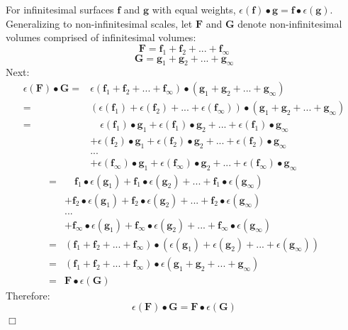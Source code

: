 For infinitesimal surfaces \(\mathbf{f}\) and \(\mathbf{g}\) with equal weights, \(\epsilon(\mathbf{f}) \bullet \mathbf{g} = \mathbf{f} \bullet \epsilon(\mathbf{g})\). Generalizing to non-infinitesimal scales, let \(\mathbf{F}\) and \(\mathbf{G}\) denote non-infinitesimal volumes comprised of infinitesimal volumes:
\[\mathbf{F} = \mathbf{f}_1 + \mathbf{f}_2 + ... + \mathbf{f}_{\infty}\] 
\[\mathbf{G} = \mathbf{g}_1 + \mathbf{g}_2 + ... + \mathbf{g}_{\infty}\]
Next:
\begin{align*}
\epsilon(\mathbf{F}) \bullet \mathbf{G} 
= & \epsilon(\mathbf{f}_1 + \mathbf{f}_2 + ... + \mathbf{f}_{\infty}) \bullet (\mathbf{g}_1 + \mathbf{g}_2 + ... + \mathbf{g}_{\infty}) \\
= & (\epsilon(\mathbf{f}_1) + \epsilon(\mathbf{f}_2) + ... + \epsilon(\mathbf{f}_{\infty})) \bullet (\mathbf{g}_1 + \mathbf{g}_2 + ... + \mathbf{g}_{\infty}) \\  
= & \quad \epsilon(\mathbf{f}_1) \bullet \mathbf{g}_1 + \epsilon(\mathbf{f}_1) \bullet \mathbf{g}_2 + ... + \epsilon(\mathbf{f}_1) \bullet \mathbf{g}_\infty \\  
& + \epsilon(\mathbf{f}_2) \bullet \mathbf{g}_1 + \epsilon(\mathbf{f}_2) \bullet \mathbf{g}_2 + ... + \epsilon(\mathbf{f}_2) \bullet \mathbf{g}_\infty \\  
& ... \\
& + \epsilon(\mathbf{f}_\infty) \bullet \mathbf{g}_1 + \epsilon(\mathbf{f}_\infty) \bullet \mathbf{g}_2 + ... + \epsilon(\mathbf{f}_\infty) \bullet \mathbf{g}_\infty   
\end{align*}
\begin{align*}
= & \quad \mathbf{f}_1 \bullet \epsilon(\mathbf{g}_1) + \mathbf{f}_1 \bullet \epsilon(\mathbf{g}_2) + ... + \mathbf{f}_1 \bullet \epsilon(\mathbf{g}_\infty) \\  
& + \mathbf{f}_2 \bullet \epsilon(\mathbf{g}_1) + \mathbf{f}_2 \bullet \epsilon(\mathbf{g}_2) + ... + \mathbf{f}_2 \bullet \epsilon(\mathbf{g}_\infty) \\  
& ... \\
& + \mathbf{f}_\infty \bullet \epsilon(\mathbf{g}_1) + \mathbf{f}_\infty \bullet \epsilon(\mathbf{g}_2) + ... + \mathbf{f}_\infty \bullet \epsilon(\mathbf{g}_\infty) \\  
= & (\mathbf{f}_1 + \mathbf{f}_2 + ... + \mathbf{f}_\infty) \bullet (\epsilon(\mathbf{g}_1) + \epsilon(\mathbf{g}_2) + ... + \epsilon(\mathbf{g}_\infty)) \\ 
= & (\mathbf{f}_1 + \mathbf{f}_2 + ... + \mathbf{f}_\infty) \bullet \epsilon(\mathbf{g}_1 + \mathbf{g}_2 + ... + \mathbf{g}_\infty) \\ 
= & \mathbf{F} \bullet \epsilon(\mathbf{G})
\end{align*}
Therefore:
\[\epsilon(\mathbf{F}) \bullet \mathbf{G} = \mathbf{F} \bullet \epsilon(\mathbf{G})\]
\(\Box\)



